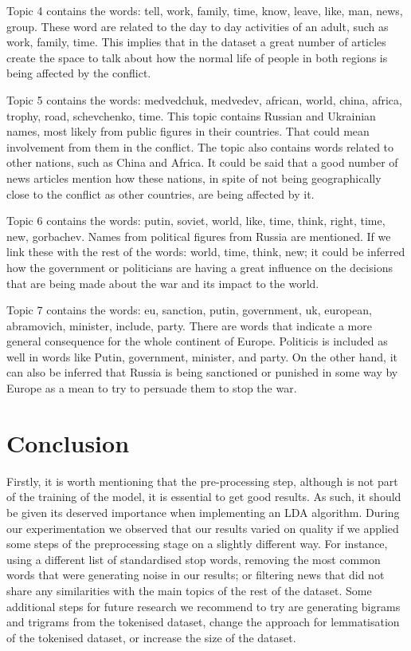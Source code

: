 \documentclass[twoside,12pt,a4paper]{article}
\begin{document}
Topic 4 contains the words: tell, work, family, time, know, leave, like, man, news, group. These word are related to the day to day activities of an adult, such as work, family, time. This implies that in the dataset a great number of articles create the space to talk about how the normal life of people in both regions is being affected by the conflict. 

Topic 5 contains the words: medvedchuk, medvedev, african, world, china, africa, trophy, road, schevchenko, time. This topic contains Russian and Ukrainian names, most likely from public figures in their countries. That could mean involvement from them in the conflict. The topic also contains words related to other nations, such as China and Africa. It could be said that a good number of news articles mention how these nations, in spite of not being geographically close to the conflict as other countries, are being affected by it.

Topic 6 contains the words: putin, soviet, world, like, time, think, right, time, new, gorbachev. Names from political figures from Russia are mentioned. If we link these with the rest of the words: world, time, think, new; it could be inferred how the government or politicians are having a great influence on the decisions that are being made about the war and its impact to the world.

Topic 7 contains the words: eu, sanction, putin, government, uk, european, abramovich, minister, include, party. There are words that indicate a more general consequence for the whole continent of Europe. Politicis is included as well in words like Putin, government, minister, and party. On the other hand, it can also be inferred that Russia is being sanctioned or punished in some way by Europe as a mean to try to persuade them to stop the war.

\clearpage
\section{Conclusion}
Firstly, it is worth mentioning that the pre-processing step, although is not part of the training of the model, it is essential to get good results. As such, it should be given its deserved importance when implementing an LDA algorithm. During our experimentation we observed that our results varied on quality if we applied some steps of the preprocessing stage on a slightly different way. For instance, using a different list of standardised stop words, removing the most common words that were generating noise in our results; or filtering news that did not share any similarities with the main topics of the rest of the dataset. Some additional steps for future research we recommend to try are generating bigrams and trigrams from the tokenised dataset, change the approach for lemmatisation of the tokenised dataset, or increase the size of the dataset. 
\end{document}

